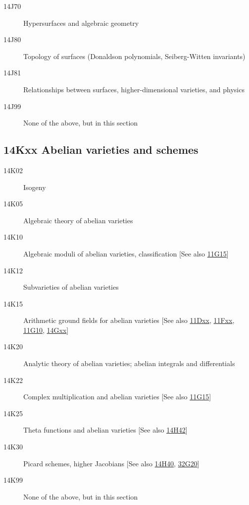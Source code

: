 \begin{description}
\item [14J70]\label{14J70} Hypersurfaces and algebraic geometry
\item [14J80]\label{14J80} Topology of surfaces (Donaldson polynomials, Seiberg-Witten invariants)
\item [14J81]\label{14J81} Relationships between surfaces, higher-dimensional varieties, and physics
\item [14J99]\label{14J99} None of the above, but in this section
\end{description}          
\subsection*{14Kxx Abelian varieties and schemes }\label{14Kxx}
\begin{description}               
\item [14K02]\label{14K02} Isogeny
\item [14K05]\label{14K05} Algebraic theory of abelian varieties
\item [14K10]\label{14K10} Algebraic moduli of abelian varieties, classification [See also \hyperref[11G15]{11G15}]
\item [14K12]\label{14K12} Subvarieties of abelian varieties
\item [14K15]\label{14K15} Arithmetic ground fields for abelian varieties [See also \hyperref[11Dxx]{11Dxx}, \hyperref[11Fxx]{11Fxx}, \hyperref[11G10]{11G10}, \hyperref[14Gxx]{14Gxx}]
\item [14K20]\label{14K20} Analytic theory of abelian varieties; abelian integrals and differentials
\item [14K22]\label{14K22} Complex multiplication and abelian varieties [See also \hyperref[11G15]{11G15}]
\item [14K25]\label{14K25} Theta functions and abelian varieties [See also \hyperref[14H42]{14H42}]
\item [14K30]\label{14K30} Picard schemes, higher Jacobians [See also \hyperref[14H40]{14H40}, \hyperref[32G20]{32G20}]
\item [14K99]\label{14K99} None of the above, but in this section
\end{description}          
